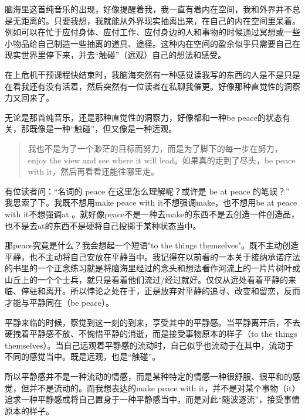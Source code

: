 脑海里这首纯音乐的出现，好像提醒着我，我一直有着内在空间，我和外界并不总是无距离的。只要我想，我就能从外界现实抽离出来，在自己的内在空间里呆着。例如可以在忙于应付身体、应付工作、应付身边的人和事物的时候通过冥想或一些小物品给自己制造一些抽离的道具、途径。这种内在空间的盈余似乎只需要自己在现实世界里停下来，并去“触碰”（远观）自己的想法和感受。

在上危机干预课程快结束时，我脑海突然有一种感觉\pozhehao{}读我写的东西的人是不是只是在看我还有没有活着，然后突然有一位读者在私聊我催更。好像那种直觉性的洞察力又回来了。

无论是那首纯音乐，还是那种直觉性的洞察力，好像都和一种be peace的状态有关，那既像是一种“触碰”，但又像是一种远观。

\blockquote{
    我也不是为了一个渺茫的目标而努力，而是为了脚下的每一步在努力，enjoy the view and see where it will lead。如果真的走到了尽头，be peace with it，然后再看看还能往哪里走。

}

有位读者问：“名词的 peace 在这里怎么理解呢？或许是 be at peace 的笔误？” 我思索了下。我既不想用make peace with it\pozhehao{}不想强调make，也不想用be at peace with it\pozhehao{}不想强调at 。就好像peace不是一种去make的东西\pozhehao{}不是去创造一件创造品，也不是去at的东西\pozhehao{}不是硬将自己投掷于某种状态当中。

那peace究竟是什么？我会想起一个短语"to the things themselves"。既不主动创造平静，也不主动将自己安放在平静当中。我记得在以前看的一本关于接纳承诺疗法的书里的一个正念练习就是将脑海里经过的念头和想法看作河流上的一片片树叶或山丘上的一个个士兵，就只是看着他们流过/经过就好。仅仅从远处看着平静的来临、停驻和离开。所以悖论之处在于，正是放弃对平静的追寻、改变和留恋，反而才能与平静同在（be peace）。

平静来临的时候，察觉到这一刻的到来，享受其中的平静感。当平静离开后，不去硬拽着平静感不放、不惋惜平静的消逝，而是接受事物原本的样子（to the things themselves）。当自己远观着平静感的流动时，自己似乎也流动于在其中，流动于不同的感觉当中。既是远观，也是“触碰”。

所以平静感并不是一种流动的情感，而是某种特定的情感\pozhehao{}一种很舒服、很平和的感觉，但并不是流动的。而我想表达的make peace with it，并不是对某个事物（it）追求一种平静感或将自己置身于一种平静感当中，而是对此“随波逐流”，接受事情原本的样子。

